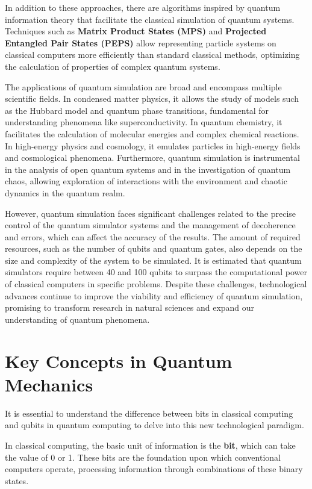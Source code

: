 In addition to these approaches, there are algorithms inspired by quantum information theory that facilitate the classical simulation of quantum systems. Techniques such as \textbf{Matrix Product States (MPS)} and \textbf{Projected Entangled Pair States (PEPS)} allow representing particle systems on classical computers more efficiently than standard classical methods, optimizing the calculation of properties of complex quantum systems.

The applications of quantum simulation are broad and encompass multiple scientific fields. In condensed matter physics, it allows the study of models such as the Hubbard model and quantum phase transitions, fundamental for understanding phenomena like superconductivity. In quantum chemistry, it facilitates the calculation of molecular energies and complex chemical reactions. In high-energy physics and cosmology, it emulates particles in high-energy fields and cosmological phenomena. Furthermore, quantum simulation is instrumental in the analysis of open quantum systems and in the investigation of quantum chaos, allowing exploration of interactions with the environment and chaotic dynamics in the quantum realm.

However, quantum simulation faces significant challenges related to the precise control of the quantum simulator systems and the management of decoherence and errors, which can affect the accuracy of the results. The amount of required resources, such as the number of qubits and quantum gates, also depends on the size and complexity of the system to be simulated. It is estimated that quantum simulators require between 40 and 100 qubits to surpass the computational power of classical computers in specific problems. Despite these challenges, technological advances continue to improve the viability and efficiency of quantum simulation, promising to transform research in natural sciences and expand our understanding of quantum phenomena.

\section{Key Concepts in Quantum Mechanics}

It is essential to understand the difference between bits in classical computing and qubits in quantum computing to delve into this new technological paradigm.

In classical computing, the basic unit of information is the \textbf{bit}, which can take the value of 0 or 1. These bits are the foundation upon which conventional computers operate, processing information through combinations of these binary states.

